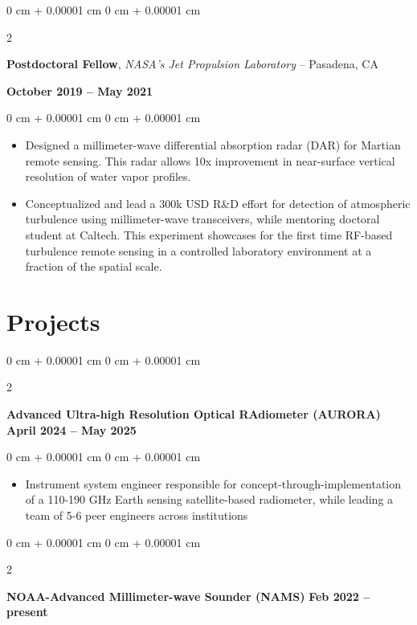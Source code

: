 \documentclass[10pt, letterpaper]{article}
\newenvironment{highlights}{
    \begin{itemize}[
        topsep=0.10 cm,
        parsep=0.10 cm,
        partopsep=0pt,
        itemsep=0pt,
        leftmargin=0 cm + 10pt     
    ]
}{
    \end{itemize}
} %
\newenvironment{onecolentry}{
    \begin{adjustwidth}{
        0 cm + 0.00001 cm
    }{
        0 cm + 0.00001 cm
    }
}{
    \end{adjustwidth}
} %
\newenvironment{twocolentry}[2][]{
    \onecolentry
    \def\secondColumn{#2}
    \setcolumnwidth{\fill, 4.5 cm}
    \begin{paracol}{2}
}{
    \switchcolumn \raggedleft \secondColumn
    \end{paracol}
    \endonecolentry
} %
\begin{document}
        \begin{twocolentry}{
            \textbf{October 2019 – May 2021}
        }
            \textbf{Postdoctoral Fellow}, \textit{NASA's Jet Propulsion Laboratory} -- Pasadena, CA
        \end{twocolentry}
        \vspace{0.30 cm}
        \begin{onecolentry}
            \begin{highlights}
                \item Designed a millimeter-wave differential absorption radar (DAR) for Martian remote sensing. This radar allows 10x improvement in near-surface vertical resolution of water vapor profiles. 
                \item Conceptualized and lead a 300k USD R\&D effort for detection of atmospheric turbulence using millimeter-wave transceivers, while mentoring doctoral student at Caltech. This experiment showcases for the first time RF-based turbulence remote sensing in a controlled laboratory environment at a fraction of the spatial scale.
            \end{highlights}
        \end{onecolentry}
    
    \section{Projects}
       \justifying
        \begin{twocolentry}{
            \textbf{April 2024 -- May 2025}
        }
            \textbf{Advanced Ultra-high Resolution Optical RAdiometer (AURORA)}\end{twocolentry}

        \vspace{0.20 cm}
        \begin{onecolentry}
            \begin{highlights}
                \item Instrument system engineer responsible for concept-through-implementation of a 110-190 GHz Earth sensing satellite-based radiometer, while leading a team of 5-6 peer engineers across institutions
            \end{highlights}
        \end{onecolentry}


        \vspace{0.3 cm}

        \begin{twocolentry}{
            \textbf{Feb 2022 -- present}
        }
            \textbf{NOAA-Advanced Millimeter-wave Sounder (NAMS)}\end{twocolentry}
\end{document}
